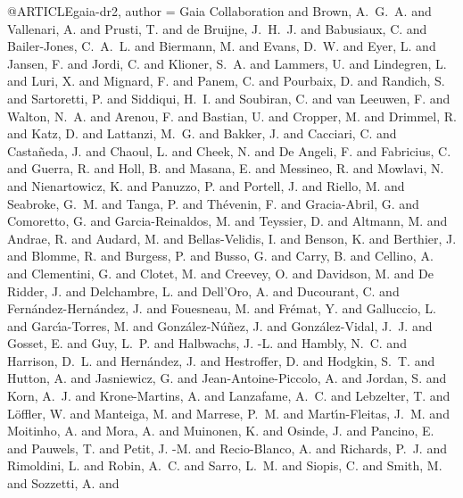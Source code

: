 \documentclass[a4paper,fleqn,usenatbib]{mnras}
\begin{document}
@ARTICLE{gaia-dr2,
       author = {{Gaia Collaboration} and {Brown}, A.~G.~A. and {Vallenari}, A. and
         {Prusti}, T. and {de Bruijne}, J.~H.~J. and {Babusiaux}, C. and
         {Bailer-Jones}, C.~A.~L. and {Biermann}, M. and {Evans}, D.~W. and
         {Eyer}, L. and {Jansen}, F. and {Jordi}, C. and {Klioner}, S.~A. and
         {Lammers}, U. and {Lindegren}, L. and {Luri}, X. and {Mignard}, F. and
         {Panem}, C. and {Pourbaix}, D. and {Randich}, S. and {Sartoretti}, P. and
         {Siddiqui}, H.~I. and {Soubiran}, C. and {van Leeuwen}, F. and
         {Walton}, N.~A. and {Arenou}, F. and {Bastian}, U. and {Cropper}, M. and
         {Drimmel}, R. and {Katz}, D. and {Lattanzi}, M.~G. and {Bakker}, J. and
         {Cacciari}, C. and {Casta{\~n}eda}, J. and {Chaoul}, L. and
         {Cheek}, N. and {De Angeli}, F. and {Fabricius}, C. and {Guerra}, R. and
         {Holl}, B. and {Masana}, E. and {Messineo}, R. and {Mowlavi}, N. and
         {Nienartowicz}, K. and {Panuzzo}, P. and {Portell}, J. and
         {Riello}, M. and {Seabroke}, G.~M. and {Tanga}, P. and
         {Th{\'e}venin}, F. and {Gracia-Abril}, G. and {Comoretto}, G. and
         {Garcia-Reinaldos}, M. and {Teyssier}, D. and {Altmann}, M. and
         {Andrae}, R. and {Audard}, M. and {Bellas-Velidis}, I. and
         {Benson}, K. and {Berthier}, J. and {Blomme}, R. and {Burgess}, P. and
         {Busso}, G. and {Carry}, B. and {Cellino}, A. and {Clementini}, G. and
         {Clotet}, M. and {Creevey}, O. and {Davidson}, M. and {De Ridder}, J. and
         {Delchambre}, L. and {Dell'Oro}, A. and {Ducourant}, C. and
         {Fern{\'a}ndez-Hern{\'a}ndez}, J. and {Fouesneau}, M. and
         {Fr{\'e}mat}, Y. and {Galluccio}, L. and {Garc{\'\i}a-Torres}, M. and
         {Gonz{\'a}lez-N{\'u}{\~n}ez}, J. and {Gonz{\'a}lez-Vidal}, J.~J. and
         {Gosset}, E. and {Guy}, L.~P. and {Halbwachs}, J. -L. and
         {Hambly}, N.~C. and {Harrison}, D.~L. and {Hern{\'a}ndez}, J. and
         {Hestroffer}, D. and {Hodgkin}, S.~T. and {Hutton}, A. and
         {Jasniewicz}, G. and {Jean-Antoine-Piccolo}, A. and {Jordan}, S. and
         {Korn}, A.~J. and {Krone-Martins}, A. and {Lanzafame}, A.~C. and
         {Lebzelter}, T. and {L{\"o}ffler}, W. and {Manteiga}, M. and
         {Marrese}, P.~M. and {Mart{\'\i}n-Fleitas}, J.~M. and {Moitinho}, A. and
         {Mora}, A. and {Muinonen}, K. and {Osinde}, J. and {Pancino}, E. and
         {Pauwels}, T. and {Petit}, J. -M. and {Recio-Blanco}, A. and
         {Richards}, P.~J. and {Rimoldini}, L. and {Robin}, A.~C. and
         {Sarro}, L.~M. and {Siopis}, C. and {Smith}, M. and {Sozzetti}, A. and
}}
\end{document}
